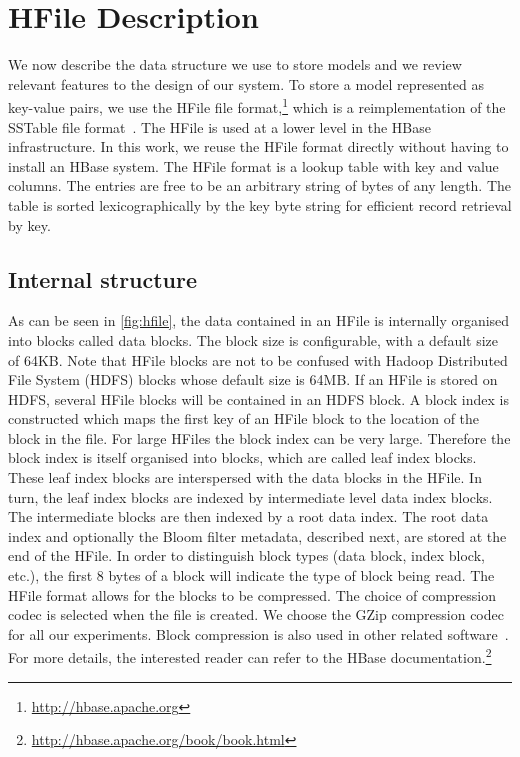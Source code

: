 \section{HFile Description}
\label{sec:hfile}

We now describe the data structure we use to store models and we review relevant
features to the design of our system. To store a model represented as key-value
pairs, we use the HFile file format,\footnote{\url{http://hbase.apache.org}} which is
a reimplementation of the SSTable file
format~\citep{chang-dean-ghemawat-hsieh-wallach-burrows-chandra-fikes-gruber:2008:ACM}.
The HFile is used at a lower level in the HBase infrastructure. In this work, we
reuse the HFile format directly without having to install an HBase system. The
HFile format is a lookup table with key and value columns. The entries are free
to be an arbitrary string of bytes of any length. The table is sorted
lexicographically by the key byte string for efficient record retrieval by key.

\subsection{Internal structure}

As can be seen in \autoref{fig:hfile}, the data contained in an HFile is
internally organised into blocks called data blocks. The block size is
configurable, with a default size of 64KB. Note that HFile blocks are not to be
confused with Hadoop Distributed File System (HDFS) blocks whose default size is
64MB. If an HFile is stored on HDFS, several HFile blocks will be contained in
an HDFS block. A block index is constructed which maps the first key of an HFile
block to the location of the block in the file. For large HFiles the block index
can be very large. Therefore the block index is itself organised into blocks,
which are called leaf index blocks. These leaf index blocks are interspersed
with the data blocks in the HFile. In turn, the leaf index blocks are indexed by
intermediate level data index blocks. The intermediate blocks are then indexed
by a root data index. The root data index and optionally the Bloom filter
metadata, described next, are stored at the end of the HFile. In order to
distinguish block types (data block, index block, etc.), the first 8 bytes of a
block will indicate the type of block being read. The HFile format allows for
the blocks to be compressed. The choice of compression codec is selected when
the file is created. We choose the GZip compression codec for all our
experiments. Block compression is also used in other related
software~\citep{pauls-klein:2011:HLTACL}. For more details, the interested
reader can refer to the HBase
documentation.\footnote{\url{http://hbase.apache.org/book/book.html}}

